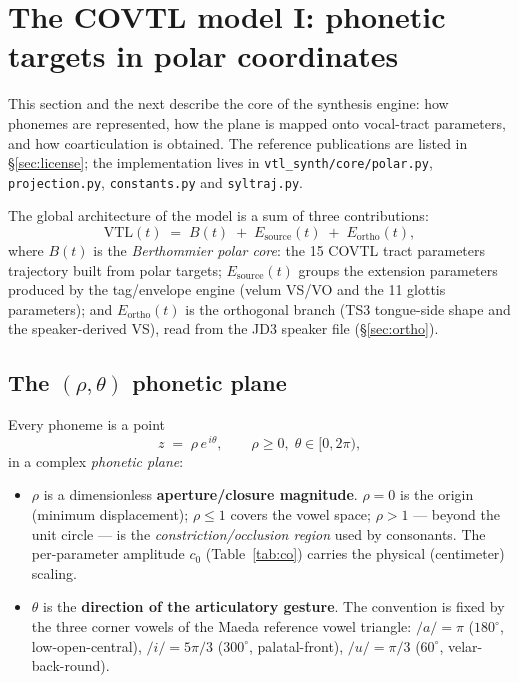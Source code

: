 \documentclass[11pt,a4paper]{article}
\begin{document}
\section{The COVTL model I: phonetic targets in polar coordinates}\label{sec:polar}

This section and the next describe the core of the synthesis engine: how
phonemes are represented, how the plane is mapped onto vocal-tract
parameters, and how coarticulation is obtained. The reference publications
are listed in \S\ref{sec:license}; the implementation lives in
\texttt{vtl\_synth/core/polar.py}, \texttt{projection.py},
\texttt{constants.py} and \texttt{syltraj.py}.

The global architecture of the model is a sum of three contributions:
\begin{equation}
\mathrm{VTL}(t) \;=\; B(t) \;+\; E_{\mathrm{source}}(t) \;+\; E_{\mathrm{ortho}}(t),
\label{eq:global}
\end{equation}
where \(B(t)\) is the \emph{Berthommier polar core}: the 15 COVTL tract
parameters trajectory built from polar targets; \(E_{\mathrm{source}}(t)\)
groups the extension parameters produced by the tag/envelope engine
(velum VS/VO and the 11 glottis parameters); and \(E_{\mathrm{ortho}}(t)\)
is the orthogonal branch (TS3 tongue-side shape and the speaker-derived
VS), read from the JD3 speaker file (\S\ref{sec:ortho}).

\subsection{The \((\rho,\theta)\) phonetic plane}\label{subsec:plane}

Every phoneme is a point
\begin{equation}
z \;=\; \rho\, e^{\,i\theta}, \qquad \rho \ge 0,\; \theta \in [0, 2\pi),
\label{eq:z}
\end{equation}
in a complex \emph{phonetic plane}:

\begin{itemize}[leftmargin=1.5em]
\item \(\rho\) is a dimensionless \textbf{aperture/closure magnitude}.
      \(\rho = 0\) is the origin (minimum displacement); \(\rho \le 1\)
      covers the vowel space; \(\rho > 1\) --- beyond the unit circle ---
      is the \emph{constriction/occlusion region} used by consonants. The
      per-parameter amplitude \(c_0\) (Table~\ref{tab:co}) carries the
      physical (centimeter) scaling.
\item \(\theta\) is the \textbf{direction of the articulatory gesture}.
      The convention is fixed by the three corner vowels of the Maeda
      reference vowel triangle:
      \(/a/ = \pi\) (\(180^\circ\), low-open-central),
      \(/i/ = 5\pi/3\) (\(300^\circ\), palatal-front),
      \(/u/ = \pi/3\) (\(60^\circ\), velar-back-round).
\end{itemize}
\end{document}
